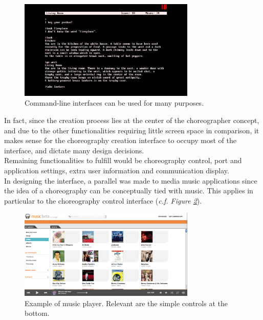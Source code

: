 \begin{figure}[ht]
   \centering
   \includegraphics[width=0.75\textwidth]{img/CommandLine.jpg}
   \caption{Command-line interfaces can be used for many purposes.}
   \label{img:CommandLine}
\end{figure}

In fact, since the creation process lies at the center of the choreographer concept, and due to the other functionalities requiring little screen space in comparison, it makes sense for the choreography creation interface to occupy most of the interface, and dictate many design decisions.\\

Remaining functionalities to fulfill would be choreography control, port and application settings, extra user information and communication display.\\

In designing the interface, a parallel was made to media music applications since the idea of a choreography can be conceptually tied with music. This applies in particular to the choreography control interface (\textit{c.f. Figure \ref{img:GoogleMusic}}).\\

\begin{figure}[ht]
   \centering
   \includegraphics[width=0.75\textwidth]{img/GoogleMusic.png}
   \caption{Example of music player. Relevant are the simple controls at the bottom.}
   \label{img:GoogleMusic}
\end{figure}

